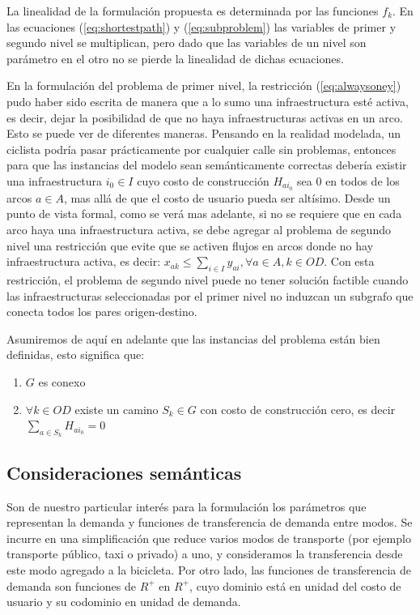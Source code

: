 \documentclass{article}
\begin{document}
  La linealidad de la formulación propuesta es determinada por las funciones $f_k$. En las ecuaciones (\ref{eq:shortestpath}) y (\ref{eq:subproblem}) las variables de primer y segundo nivel se multiplican, pero dado que las variables de un nivel son parámetro en el otro no se pierde la linealidad de dichas ecuaciones.

  En la formulación del problema de primer nivel, la restricción (\ref{eq:alwaysoney}) pudo haber sido escrita de manera que a lo sumo una infraestructura esté activa, es decir, dejar la posibilidad de que no haya infraestructuras activas en un arco. Esto se puede ver de diferentes maneras. Pensando en la realidad modelada, un ciclista podría pasar prácticamente por cualquier calle sin problemas, entonces para que las instancias del modelo sean semánticamente correctas debería existir una infraestructura $i_0 \in I$ cuyo costo de construcción $H_{ai_0}$ sea 0 en todos de los arcos $a \in A$, mas allá de que el costo de usuario pueda ser altísimo. Desde un punto de vista formal, como se verá mas adelante, si no se requiere que en cada arco haya una infraestructura activa, se debe agregar al problema de segundo nivel una restricción que evite que se activen flujos en arcos donde no hay infraestructura activa, es decir: $x_{ak} \leq \sum_{i \in I} y_{ai}, \forall a \in A, k \in OD$. Con esta restricción, el problema de segundo nivel puede no tener solución factible cuando las infraestructuras seleccionadas por el primer nivel no induzcan un subgrafo que conecta todos los pares origen-destino.

  Asumiremos de aquí en adelante que las instancias del problema están bien definidas, esto significa que:

  \begin{enumerate}
    \item {$G$ es conexo}
    \item {$\forall k \in OD$ existe un camino $S_k \in G$ con costo de construcción cero, es decir $\sum_{a \in S_k} H_{ai_0} = 0$}
  \end{enumerate}

  \subsection{Consideraciones semánticas}

  Son de nuestro particular interés para la formulación los parámetros que representan la demanda y funciones de transferencia de demanda entre modos. Se incurre en una simplificación que reduce varios modos de transporte (por ejemplo transporte público, taxi o privado) a uno, y consideramos la transferencia desde este modo agregado a la bicicleta. Por otro lado, las funciones de transferencia de demanda son funciones de $R^+$ en $R^+$, cuyo dominio está en unidad del costo de usuario y su codominio en unidad de demanda.
\end{document}
